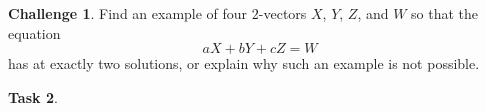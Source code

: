 \documentclass{tufte-book}
\theoremstyle{definition}
\newtheorem{task}{Task}
\newtheorem{challenge}[task]{Challenge}
\begin{document}
\begin{challenge}
Find an example of four $2$-vectors $X$, $Y$, $Z$, and $W$ so that the equation
\[
aX+bY+cZ = W
\]
has at exactly two solutions, or explain why such an example is not possible.
\end{challenge}



\begin{task}


\end{task}





%
%
\end{document}
